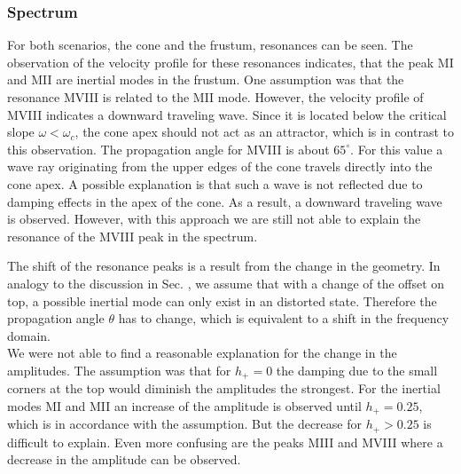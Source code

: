 \subsubsection{Spectrum}

For both scenarios, the cone and the frustum, resonances can be seen.
The observation of the velocity profile for these resonances indicates,
that the peak M\RN{1} and M\RN{2} are inertial modes in the frustum.
One assumption was that the resonance M\RN{8} is related to the M\RN{2} mode.
However, the velocity profile of M\RN{8} indicates a downward traveling wave.
Since it is located below the critical slope $\omega < \omega_c$, the cone apex
should not act as an attractor, which is in contrast to this observation.
The propagation angle for M\RN{8} is about $65^\circ$.
For this value a wave ray originating from the upper edges of the cone travels directly
into the cone apex.
A possible explanation is that such a wave is not reflected due to damping effects in
the apex of the cone. As a result, a downward traveling wave is observed.
However, with this approach we are still not able to explain the resonance of the M\RN{8} peak
in the spectrum.

The shift of the resonance peaks is a result from the change in the geometry.
In analogy to the discussion in Sec. \label{cone:discussion_transition},
 we assume that with a change of the offset on top,
a possible inertial mode can only exist in an distorted state.
Therefore the propagation angle $\theta$ has to change,
which is equivalent to a shift in the frequency domain.\\
We were not able to find a reasonable explanation for the change in the amplitudes.
The assumption was that for $h_+=0$ the damping due to the small corners at the top
would diminish the amplitudes the strongest.
For the inertial modes M\RN{1} and M\RN{2} an increase of the amplitude is observed until $h_+=0.25$,
which is in accordance with the assumption.
But the decrease for $h_+>0.25$ is difficult to explain.
Even more confusing are  the peaks M\RN{3} and M\RN{8} where a decrease in the amplitude
can be observed.

